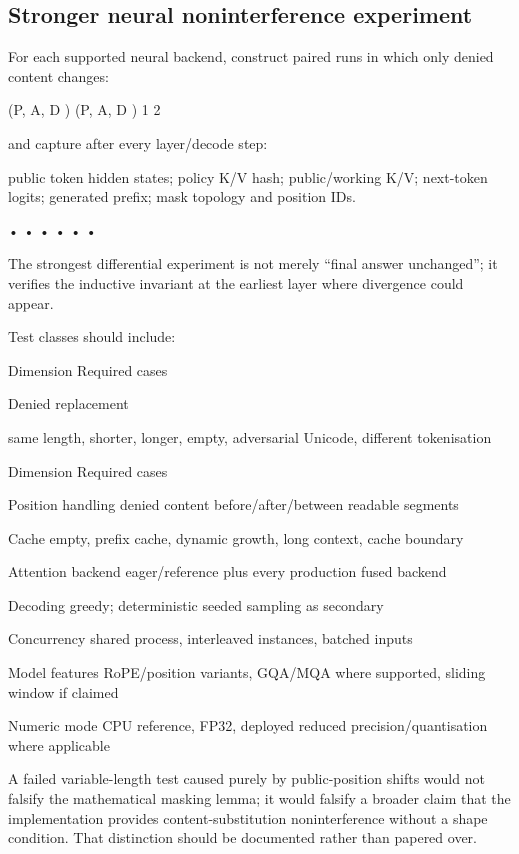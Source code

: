 \documentclass[11pt,a4paper]{article}
\begin{document}
\subsection*{Stronger neural noninterference experiment}
For each supported neural backend, construct paired runs in which only denied content changes:\par
(P, A, D ) (P, A, D ) 1 2\par
and capture after every layer/decode step:\par
public token hidden states; policy K/V hash; public/working K/V; next-token logits; generated prefix; mask topology and position IDs.\par
• • • • • •\par
The strongest differential experiment is not merely “final answer unchanged”; it verifies the inductive invariant at the earliest layer where divergence could appear.\par
Test classes should include:\par
Dimension Required cases\par
Denied replacement\par
same length, shorter, longer, empty, adversarial Unicode, different tokenisation\par
Dimension Required cases\par
Position handling denied content before/after/between readable segments\par
Cache empty, prefix cache, dynamic growth, long context, cache boundary\par
Attention backend eager/reference plus every production fused backend\par
Decoding greedy; deterministic seeded sampling as secondary\par
Concurrency shared process, interleaved instances, batched inputs\par
Model features RoPE/position variants, GQA/MQA where supported, sliding window if claimed\par
Numeric mode CPU reference, FP32, deployed reduced precision/quantisation where applicable\par
A failed variable-length test caused purely by public-position shifts would not falsify the mathematical masking lemma; it would falsify a broader claim that the implementation provides content-substitution noninterference without a shape condition. That distinction should be documented rather than papered over.\par
\end{document}
